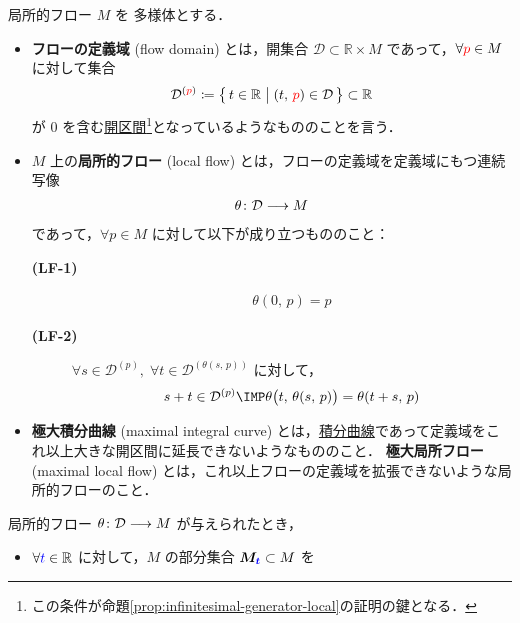 \documentclass[geometry_main]{subfiles}
\begin{document}
\begin{mydef}[label=def:local-flow, breakable]{局所的フロー}
    $M$ を \cinfty 多様体とする．
    \begin{itemize}
        \item \textbf{フローの定義域} (flow domain) とは，開集合 $\bm{\mathcal{D}} \subset \mathbb{R} \times M$ であって，$\forall \textcolor{red}{p} \in M$ に対して集合
        \begin{align}
            \mathcal{D}^{(\textcolor{red}{p})} \coloneqq \bigl\{\, t \in \mathbb{R} \bigm| (t,\, \textcolor{red}{p}) \in \mathcal{D} \,\bigr\}  \subset \mathbb{R}
        \end{align}
        が $0$ を含む\underline{開区間}\footnote{この条件が命題\ref{prop:infinitesimal-generator-local}の証明の鍵となる．}となっているようなもののことを言う．
        \item $M$ 上の\textbf{局所的フロー} (local flow) とは，フローの定義域を定義域にもつ連続写像
        \begin{align}
            \theta \colon \mathcal{D} \longrightarrow M
        \end{align}
        であって，$\forall p \in M$ に対して以下が成り立つもののこと：
        \begin{description}
            \item[\textbf{(LF-1)}]  
            \begin{align}
                \theta (0,\, p) = p
            \end{align}
            \item[\textbf{(LF-2)}] $\forall s \in \mathcal{D}^{(p)},\; \forall t \in \mathcal{D}^{(\theta(s,\, p))}$ に対して，
            \begin{align}
                s + t \in \mathcal{D}^{(p)} \IMP \theta \bigl( t,\, \theta(s,\, p) \bigr)  = \theta(t + s,\, p)
            \end{align}
        \end{description}
        \item \textbf{極大積分曲線} (maximal integral curve) とは，\hyperref[def:integral-curve]{積分曲線}であって定義域をこれ以上大きな開区間に延長できないようなもののこと．
        \textbf{極大局所フロー} (maximal local flow) とは，これ以上フローの定義域を拡張できないような局所的フローのこと．
    \end{itemize}
    \tcblower
    局所的フロー $\theta \colon \mathcal{D} \longrightarrow M$ が与えられたとき，
    \begin{itemize}
        \item $\forall \textcolor{blue}{t} \in \mathbb{R}$ に対して，$M$ の部分集合 $\bm{M_{\textcolor{blue}{t}}} \subset M$ を

\end{itemize}
\end{mydef}
\end{document}
